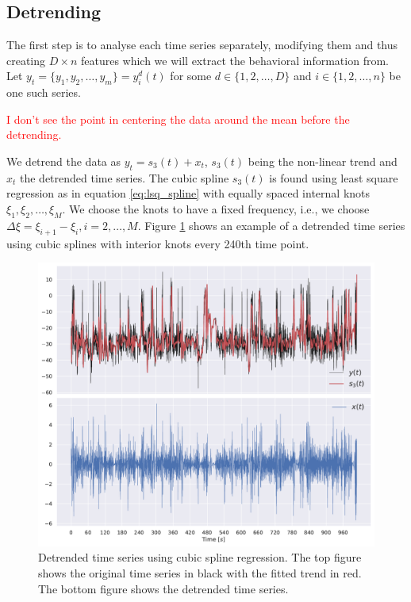 \documentclass[a4paper, 10pt]{memoir}
\theoremstyle{plain}
\theoremstyle{definition}
\theoremstyle{remark}
\begin{document}
\subsection{Detrending}
The first step is to analyse each time series separately, modifying them and thus creating $D \times n$ features which we will extract the behavioral information from.
Let $y_t = \{ y_1, y_2, \hdots, y_m \} = y_i^d(t)$ for some $d \in \{ 1, 2, \hdots, D \}$ and $i \in \{ 1, 2, \hdots, n \}$ be one such series.

\textcolor{red}{I don't see the point in centering the data around the mean before the detrending.}

We detrend the data as $y_t = s_3(t) + x_t$, $s_3(t)$ being the non-linear trend and $x_t$ the detrended time series.
The cubic spline $s_3(t)$ is found using least square regression as in equation \eqref{eq:lsq_spline} with equally spaced internal knots $\xi_1, \xi_2, \hdots, \xi_M$.
We choose the knots to have a fixed frequency, i.e., we choose $\Delta \xi= \xi_{i+1} - \xi_i, i = 2, \hdots, M$.
Figure \ref{fig:detrending_bc} shows an example of a detrended time series using cubic splines with interior knots every 240th time point.


\begin{figure}[tb ]
        \centering
        \includegraphics[width=\linewidth]{./code/figures/detrending/detrending_animal_1_BackPitch.pdf}
        \caption{Detrended time series using cubic spline regression.
        The top figure shows the original time series in black with the fitted trend in red.
The bottom figure shows the detrended time series.}
        \label{fig:detrending_bc}
\end{figure}
\end{document}

